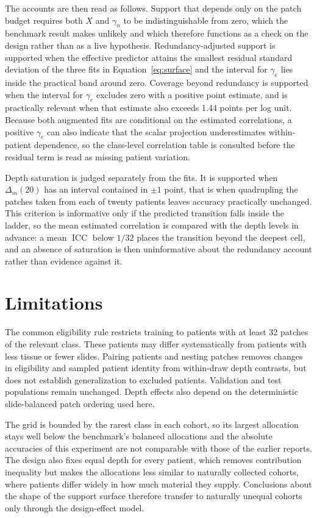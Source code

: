 \documentclass[11pt]{article}
\newcommand{\ICC}{\operatorname{ICC}}
\begin{document}
The accounts are then read as follows. Support that depends only on the patch budget requires both $X$ and $\gamma_n$ to be indistinguishable from zero, which the benchmark result makes unlikely and which therefore functions as a check on the design rather than as a live hypothesis. Redundancy-adjusted support is supported when the effective predictor attains the smallest residual standard deviation of the three fits in Equation~\eqref{eq:surface} and the interval for $\gamma_e$ lies inside the practical band around zero. Coverage beyond redundancy is supported when the interval for $\gamma_e$ excludes zero with a positive point estimate, and is practically relevant when that estimate also exceeds 1.44 points per log unit. Because both augmented fits are conditional on the estimated correlations, a positive $\gamma_e$ can also indicate that the scalar projection underestimates within-patient dependence, so the class-level correlation table is consulted before the residual term is read as missing patient variation.

Depth saturation is judged separately from the fits. It is supported when $\Delta_m(20)$ has an interval contained in $\pm1$ point, that is when quadrupling the patches taken from each of twenty patients leaves accuracy practically unchanged. This criterion is informative only if the predicted transition falls inside the ladder, so the mean estimated correlation is compared with the depth levels in advance: a mean $\ICC$ below $1/32$ places the transition beyond the deepest cell, and an absence of saturation is then uninformative about the redundancy account rather than evidence against it.



\clearpage
\section{Limitations}
\label{sec:limitations}
The common eligibility rule restricts training to patients with at least 32 patches of the relevant class. These patients may differ systematically from patients with less tissue or fewer slides. Pairing patients and nesting patches removes changes in eligibility and sampled patient identity from within-draw depth contrasts, but does not establish generalization to excluded patients. Validation and test populations remain unchanged. Depth effects also depend on the deterministic slide-balanced patch ordering used here.

The grid is bounded by the rarest class in each cohort, so its largest allocation stays well below the benchmark's balanced allocations and the absolute accuracies of this experiment are not comparable with those of the earlier reports. The design also fixes equal depth for every patient, which removes contribution inequality but makes the allocations less similar to naturally collected cohorts, where patients differ widely in how much material they supply. Conclusions about the shape of the support surface therefore transfer to naturally unequal cohorts only through the design-effect model.
\end{document}
